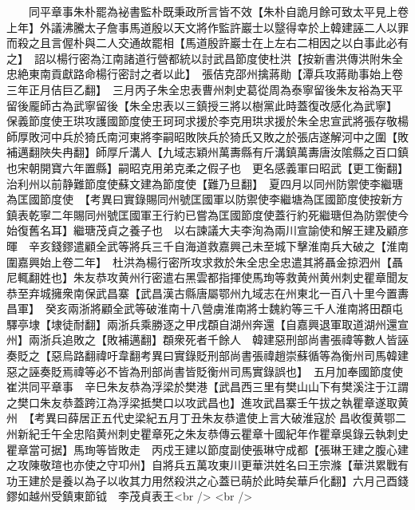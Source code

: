 　　同平章事朱朴罷為袐書監朴既秉政所言皆不效【朱朴自詭月餘可致太平見上卷上年】外議沸騰太子詹事馬道殷以天文將作監許巖士以毉得幸於上韓建誣二人以罪而殺之且言偓朴與二人交通故罷相【馬道殷許巖士在上左右二相因之以白事此必有之】　詔以楊行密為江南諸道行營都統以討武昌節度使杜洪【按新書洪傳洪附朱全忠絶東南貢獻路命楊行密討之者以此】　張佶克邵州擒蔣勛【潭兵攻蔣勛事始上卷三年正月佶巨乙翻】　三月丙子朱全忠表曹州刺史葛從周為泰寧留後朱友裕為天平留後龎師古為武寧留後【朱全忠表以三鎮授三將以樹黨此時蓋復改感化為武寧】　保義節度使王珙攻護國節度使王珂珂求援於李克用珙求援於朱全忠宣武將張存敬楊師厚敗河中兵於猗氏南河東將李嗣昭敗陜兵於猗氏又敗之於張店遂解河中之圍【敗補邁翻陜失冉翻】師厚斤溝人【九域志穎州萬夀縣有斤溝鎮萬夀唐汝隂縣之百口鎮也宋朝開寶六年置縣】嗣昭克用弟克柔之假子也　更名感義軍曰昭武【更工衡翻】治利州以前静難節度使蘇文建為節度使【難乃旦翻】　夏四月以同州防禦使李繼瑭為匡國節度使　【考異曰實錄賜同州號匡國軍以防禦使李繼塘為匡國節度使按新方鎮表乾寧二年賜同州號匡國軍王行約已嘗為匡國節度使蓋行約死繼瑭但為防禦使今始復舊名耳】繼瑭茂貞之養子也　以右諫議大夫李洵為兩川宣諭使和解王建及顧彦暉　辛亥錢鏐遣顧全武等將兵三千自海道救嘉興己未至城下擊淮南兵大破之【淮南圍嘉興始上卷二年】　杜洪為楊行密所攻求救於朱全忠全忠遣其將聶金掠泗州【聶尼輒翻姓也】朱友恭攻黄州行密遣右黑雲都指揮使馬珣等救黄州黄州刺史瞿章聞友恭至弃城擁衆南保武昌寨【武昌漢古縣唐屬鄂州九域志在州東北一百八十里今置夀昌軍】　癸亥兩浙將顧全武等破淮南十八營虜淮南將士魏約等三千人淮南將田頵屯驛亭埭【埭徒耐翻】兩浙兵乘勝逐之甲戌頵自湖州奔還【自嘉興退軍取道湖州還宣州】兩浙兵追敗之【敗補邁翻】頵衆死者千餘人　韓建惡刑部尚書張禕等數人皆誣奏貶之【惡烏路翻禕吁韋翻考異曰實錄貶刑部尚書張禕趙崇蘇循等為衡州司馬韓建惡之誣奏貶焉禕等必不皆為刑部尚書皆貶衡州司馬實錄誤也】　五月加奉國節度使崔洪同平章事　辛巳朱友恭為浮梁於樊港【武昌西三里有樊山山下有樊溪注于江謂之樊口朱友恭蓋跨江為浮梁抵樊口以攻武昌也】進攻武昌寨壬午拔之執瞿章遂取黄州　【考異曰薛居正五代史梁紀五月丁丑朱友恭遣使上言大破淮寇於昌收復黄鄂二州新紀壬午全忠陷黄州刺史瞿章死之朱友恭傳云瞿章十國紀年作瞿章吳錄云執刺史瞿章當可据】馬珣等皆敗走　丙戍王建以節度副使張琳守成都【張琳王建之腹心建之攻陳敬瑄也亦使之守卭州】自將兵五萬攻東川更華洪姓名曰王宗滌【華洪累戰有功王建於是養以為子以收其力用然殺洪之心蓋已萌於此時矣華戶化翻】六月己酉錢鏐如越州受鎮東節钺　李茂貞表王<br />
<br />
